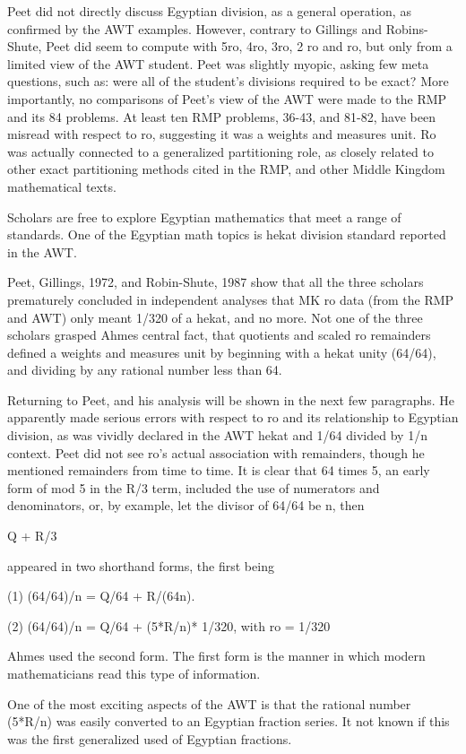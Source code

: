 \documentclass[12pt]{article}
\begin{document}
Peet did not directly discuss Egyptian division, as a general operation, as confirmed by the AWT examples. However, contrary to Gillings and Robins-Shute, Peet did seem to compute with 5ro, 4ro, 3ro, 2 ro and ro, but only from a limited view of the AWT student. Peet was slightly myopic, asking few meta questions, such as: were all of the student's divisions required to be exact? More importantly, no comparisons of Peet's view of the AWT were made to the RMP and its 84 problems. At least ten RMP problems, 36-43, and 81-82, have been misread with respect to ro, suggesting it was a weights and measures unit. Ro was actually connected to a generalized partitioning role, as closely related to other exact partitioning methods cited in the RMP, and other Middle Kingdom mathematical texts.

Scholars are  free to explore Egyptian mathematics that meet a range of standards. One of the Egyptian math topics is hekat division standard reported in the AWT.

Peet, Gillings, 1972, and Robin-Shute, 1987 show that all the three scholars prematurely concluded in independent analyses that MK ro data (from the RMP and AWT) only meant 1/320 of a hekat, and no more. Not one of the three scholars grasped Ahmes central fact, that quotients and scaled ro remainders defined a weights and measures unit by beginning with a hekat unity (64/64), and dividing by any rational number less than 64.

Returning to Peet, and his analysis will be shown in the next few paragraphs. He apparently made serious errors with respect to ro and its relationship to Egyptian division, as was vividly declared in the AWT hekat and 1/64 divided by 1/n context. Peet did not see ro's actual association with remainders, though he mentioned remainders from time to time. It is clear that 64 times 5, an early form of mod 5 in the R/3 term, included the use of numerators and denominators, or, by example, let the divisor of 64/64 be n, then

Q + R/3

appeared in two shorthand forms, the first being

(1) (64/64)/n = Q/64 + R/(64n).

(2) (64/64)/n = Q/64 + (5*R/n)* 1/320, with ro = 1/320

Ahmes used the second form. The first form is the manner in which modern mathematicians read this type of information.

One of the most exciting aspects of the AWT is that the rational number (5*R/n) was easily converted to an Egyptian fraction series. It not known if this was the
first generalized used of Egyptian fractions.
\end{document}
